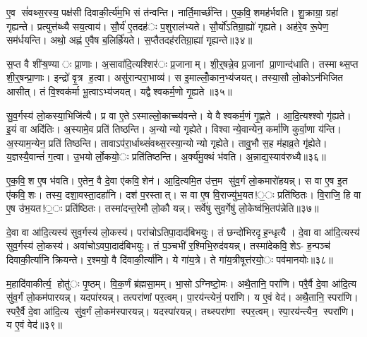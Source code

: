 ए॒व सं॑वथ्स॒रस्य॒ पक्ष॑सी दिवाकी॒र्त्य॑म॒भि सं त॑न्वन्ति। नार्ति॒मार्च्छ॑न्ति। ए॒क॒वि॒शमह॑र्भवति। शु॒क्राग्रा॒ ग्रहा॑ गृह्यन्ते। प्रत्युत्त॑ब्ध्यै सय॒त्वाय॑। सौ॒र्य॑ ए॒तदह॑ः प॒शुराल॑भ्यते। सौ॒र्यो॑ऽतिग्रा॒ह्यो॑ गृह्यते। अह॑रे॒व रू॒पेण॒ सम॑र्धयन्ति। अथो॒ अह्न॑ ए॒वैष ब॒लिर्ह्रि॑यते। स॒प्तैतदह॑रतिग्रा॒ह्या॑ गृह्यन्ते॥३४॥

स॒प्त वै शी॑ऱ्ष॒ण्याः प्रा॒णाः। अ॒सावा॑दि॒त्यश्शिर॑ः प्र॒जानाम्। शी॒र्॒षन्ने॒व प्र॒जानां प्रा॒णान्द॑धाति। तस्माथ्स॒प्त शी॒र्॒षन्प्रा॒णाः। इन्द्रो॑ वृ॒त्र ह॒त्वा। असु॑रान्परा॒भाव्य॑। स इ॒माल्लोँ॒कान॒भ्य॑जयत्। तस्या॒सौ लो॒कोऽन॑भिजित आसीत्। तं वि॒श्वक॑र्मा भू॒त्वाऽभ्य॑जयत्। यद्वैश्वकर्म॒णो गृ॒ह्यते॥३५॥

सु॒व॒र्गस्य॑ लो॒कस्या॒भिजि॑त्यै। प्र वा ए॒तेऽस्माल्लो॒काच्च्य॑वन्ते। ये वैश्वकर्म॒णं गृ॒ह्णते। आ॒दि॒त्यश्श्वो गृ॑ह्यते। इ॒यं वा अदि॑तिः। अ॒स्यामे॒व प्रति॑ तिष्ठन्ति। अ॒न्योन्यो गृह्येते। विश्वान्ये॒वान्येन॒ कर्मा॑णि कुर्वा॒णा य॑न्ति। अ॒स्याम॒न्येन॒ प्रति॑ तिष्ठन्ति। तावाऽप॑रा॒र्धाथ्सं॑वथ्स॒रस्या॒न्योन्यो गृह्येते। तावु॒भौ स॒ह म॑हाव्र॒ते गृ॑ह्येते। य॒ज्ञस्यै॒वान्तं॑ ग॒त्वा। उ॒भयोर्लो॒कयो॒ः प्रति॑तिष्ठन्ति। अ॒र्क्य॑मु॒क्थं भ॑वति। अ॒न्नाद्य॒स्याव॑रुध्यै॥३६॥


ए॒क॒वि॒श ए॒ष भ॑वति। ए॒तेन॒ वै दे॒वा ए॑कवि॒शेन॑। आ॒दि॒त्यमि॒त उ॑त्त॒म सु॑व॒र्गं लो॒कमारो॑हयन्न्। स वा ए॒ष इ॒त ए॑कवि॒शः। तस्य॒ दशा॒वस्ता॒दहा॑नि। दश॑ प॒रस्तात्। स वा ए॒ष वि॒राज्यु॑भ॒यत!॒ः प्रति॑ष्ठितः। वि॒राजि॒ हि वा ए॒ष उ॑भ॒यत!॒ः प्रति॑ष्ठितः। तस्मा॑दन्त॒रेमौ लो॒कौ यन्न्। सर्वे॑षु सुव॒र्गेषु॑ लो॒केष्व॑भि॒तप॑न्नेति॥३७॥

दे॒वा वा आ॑दि॒त्यस्य॑ सुव॒र्गस्य॑ लो॒कस्य॑। परा॑चोऽतिपा॒दाद॑बिभयुः। तं छन्दो॑भिरदृह॒न्धृत्यै। दे॒वा वा आ॑दि॒त्यस्य॑ सुव॒र्गस्य॑ लो॒कस्य॑। अवा॑चोऽवपा॒दाद॑बिभयुः। तं प॒ञ्चभी॑ र॒श्मिभि॒रुद॑वयन्न्। तस्मा॑देकवि॒शेऽ- ह॒न्पञ्च॑ दिवाकी॒र्त्या॑नि क्रियन्ते। र॒श्मयो॒ वै दि॑वाकी॒र्त्या॑नि। ये गा॑य॒त्रे। ते गा॑य॒त्रीषूत्त॑रयो॒ः पव॑मानयोः॥३८॥

म॒हादि॑वाकीर्त्य॒ होतु॑ः पृ॒ष्ठम्। वि॒क॒र्णं ब्र॑ह्मसा॒मम्। भा॒सोऽग्निष्टो॒मः। अथै॒तानि॒ परा॑णि। परै॒र्वै दे॒वा आ॑दि॒त्य सु॑व॒र्गं लो॒कम॑पारयन्न्। यदपा॑रयन्न्। तत्परा॑णां पर॒त्वम्। पा॒रय॑न्त्येनं॒ परा॑णि। य ए॒वं वेद॑। अथै॒तानि॒ स्परा॑णि। स्परै॒र्वै दे॒वा आ॑दि॒त्य सु॑व॒र्गं लो॒कम॑स्पारयन्न्। यदस्पा॑रयन्न्। तथ्स्परा॑णा स्पर॒त्वम्। स्पा॒रय॑न्त्यैन॒ स्परा॑णि। य ए॒वं वेद॑॥३९॥


